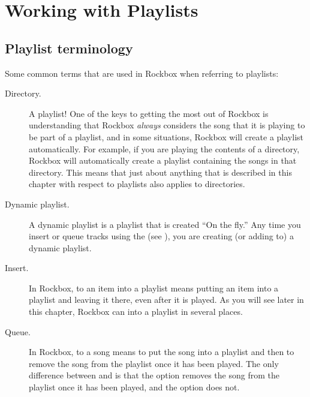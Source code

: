 \section{Working with Playlists}

\subsection{Playlist terminology}
Some common terms that are used in Rockbox when referring to 
playlists:

\begin{description}
\item[Directory.]  A playlist!  One of the keys to getting the most out of 
  Rockbox is understanding that Rockbox \emph{always} considers the song that 
  it is playing to be part of a playlist, and in some situations, Rockbox will 
  create a playlist automatically.  For example, if you are playing the 
  contents of a directory, Rockbox will automatically create a playlist 
  containing the songs in that directory.  This means that just about anything 
  that is described in this chapter with respect to playlists also applies to 
  directories.
  
\item[Dynamic playlist.]  A dynamic playlist is a playlist that is created 
  ``On the fly.''  Any time you insert or queue tracks using the 
   (see ), you are 
  creating (or adding to) a dynamic playlist.
	
\item[Insert.] In Rockbox, to  an item into a playlist means 
  putting an item into a playlist and leaving it there, even after it is 
  played. As you will see later in this chapter, Rockbox can  
  into a playlist in several places.
	
\item[Queue.]  In Rockbox, to  a song means to put the song 
  into a playlist and then to remove the song from the playlist once it has 
  been played.  The only difference between  and 
   is that the  option removes the song from the 
  playlist once it has been played, and the  option does not.
\end{description}  

